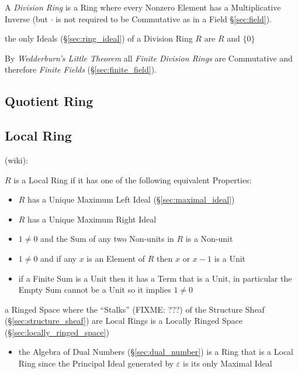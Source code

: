 A \emph{Division Ring} is a Ring where every Nonzero Element has a
Multiplicative Inverse (but $\cdot$ is not required to be Commutative
as in a Field \S\ref{sec:field}).

the only Ideals (\S\ref{sec:ring_ideal}) of a Division Ring $R$ are $R$ and
$\{0\}$

By \emph{Wedderburn's Little Theorem} all \emph{Finite Division Rings}
are Commutative and therefore \emph{Finite Fields}
(\S\ref{sec:finite_field}).



\subsection{Quotient Ring}\label{sec:quotient_ring}

\subsection{Local Ring}\label{sec:local_ring}

(wiki):

$R$ is a Local Ring if it has one of the following equivalent Properties:
\begin{itemize}
  \item $R$ has a Unique Maximum Left Ideal (\S\ref{sec:maximal_ideal})
  \item $R$ has a Unique Maximum Right Ideal
  \item $1 \neq 0$ and the Sum of any two Non-units in $R$ is a Non-unit
  \item $1 \neq 0$ and if any $x$ is an Element of $R$ then $x$ or $x - 1$ is a
    Unit
  \item if a Finite Sum is a Unit then it has a Term that is a Unit, in
    particular the Empty Sum cannot be a Unit so it implies $1 \neq 0$
\end{itemize}

a Ringed Space where the ``Stalks'' (FIXME: ???) of the Structure Sheaf
(\S\ref{sec:structure_sheaf}) are Local Rings is a Locally Ringed Space
(\S\ref{sec:locally_ringed_space})

\begin{itemize}
  \item the Algebra of Dual Numbers (\S\ref{sec:dual_number}) is a Ring that is
    a Local Ring since the Principal Ideal generated by $\varepsilon$ is its
    only Maximal Ideal
\end{itemize}


